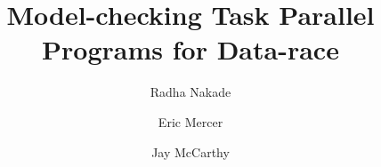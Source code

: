 \documentclass{llncs}
\begin{document}
\title{Model-checking Task Parallel Programs for Data-race}


\begin{comment}
\author{{Radha Nakade}
{Department of Computer Science\\
Brigham Young University\\
Provo, Utah\\
Email: radha.nakade@gmail.com}
\and
{Eric Mercer}
{Department of Computer Science\\
Brigham Young University\\
Provo, Utah\\
Email: egm@cs.byu.edu}
\and
{Jay McCarthy}
{Department of Computer Science\\
University of Massachusetts Lowell\\
Email: jay.mccarthy@gmail.com}}
\end{comment}

\author{Radha Nakade \and
 Eric Mercer \and
Jay McCarthy }

\maketitle

\begin{abstract}

\end{abstract}










\clearpage


\end{document}
